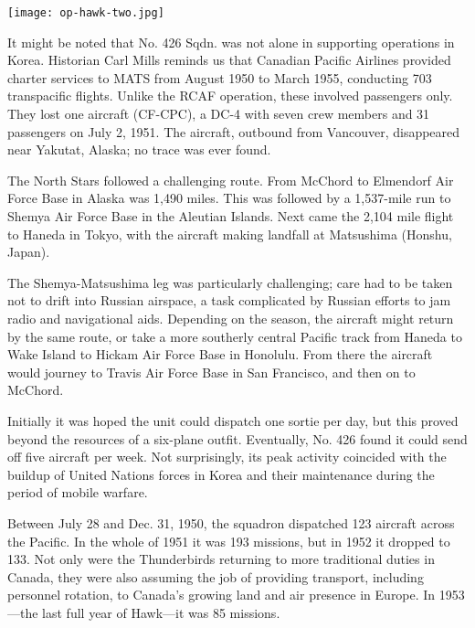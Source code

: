 \begin{figure*}[htbp]
   \vspace{2em}
   \centering
   \texttt{[image: op-hawk-two.jpg]}
   \label{fig:op-hawk-two.eps}
\end{figure*}

It might be noted that No. 426 Sqdn. was not alone in supporting
operations in Korea. Historian Carl Mills reminds us that Canadian
Pacific Airlines provided charter services to MATS from August 1950 to
March 1955, conducting 703 transpacific flights. Unlike the RCAF
operation, these involved passengers only. They lost one aircraft
(CF-CPC), a DC-4 with seven crew members and 31 passengers on July 2,
1951. The aircraft, outbound from Vancouver, disappeared near
Yakutat, Alaska; no trace was ever found.

The North Stars followed a challenging route. From McChord to
Elmendorf Air Force Base in Alaska was 1,490 miles. This was followed
by a 1,537-mile run to Shemya Air Force Base in the Aleutian
Islands. Next came the 2,104 mile flight to Haneda in Tokyo, with the
aircraft making landfall at Matsushima (Honshu, Japan).

The Shemya-Matsushima leg was particularly challenging; care had to
be taken not to drift into Russian airspace, a task complicated by
Russian efforts to jam radio and navigational aids. Depending on the
season, the aircraft might return by the same route, or take a more
southerly central Pacific track from Haneda to Wake Island to Hickam
Air Force Base in Honolulu. From there the aircraft would journey to
Travis Air Force Base in San Francisco, and then on to McChord.

Initially it was hoped the unit could dispatch one sortie per day, but
this proved beyond the resources of a six-plane outfit. Eventually,
No. 426 found it could send off five aircraft per week. Not
surprisingly, its peak activity coincided with the buildup of United
Nations forces in Korea and their maintenance during the period of
mobile warfare.

Between July 28 and Dec. 31, 1950, the squadron dispatched 123
aircraft across the Pacific. In the whole of 1951 it was 193 missions,
but in 1952 it dropped to 133. Not only were the Thunderbirds
returning to more traditional duties in Canada, they were also
assuming the job of providing transport, including personnel
rotation, to Canada's growing land and air presence in Europe. In
1953---the last full year of Hawk---it was 85 missions.

